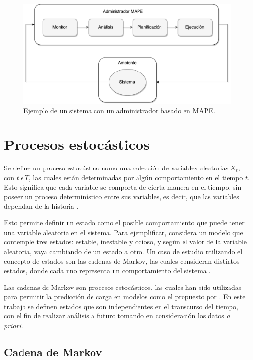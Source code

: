\begin{figure}[!ht]
	\centering
	\includegraphics[scale=0.55]{images/MAPE.pdf}
	\caption{Ejemplo de un sistema con un administrador basado en MAPE.}
	\label{fig:mape}
\end{figure}

\section{Procesos estoc\'asticos}
\label{sec:procesosEstocasticos}

Se define un proceso estoc\'astico como una colecci\'on de variables aleatorias {$X_t$, con $t ~ \epsilon ~ T$}, las cuales est\'an determinadas por alg\'un comportamiento en el tiempo $t$. Esto significa que cada variable se comporta de cierta manera en el tiempo, sin poseer un proceso determin\'istico entre sus variables, es decir, que las variables dependan de la historia \citep{taylor2014introduction}.

Esto permite definir un estado como el posible comportamiento que puede tener una variable aleatoria en el sistema. Para ejemplificar, considera un modelo que contemple tres estados: estable, inestable y ocioso, y seg\'un el valor de la variable aleatoria, vaya cambiando de un estado a otro. Un caso de estudio utilizando el concepto de estados son las cadenas de Markov, las cuales consideran distintos estados, donde cada uno representa un comportamiento del sistema \citep{de1978calculus}.

Las cadenas de Markov son procesos estoc\'asticos, las cuales han sido utilizadas para permitir la predicci\'on de carga en modelos como el propuesto por \citep{GongGW10}. En este trabajo se definen estados que son independientes en el transcurso del tiempo, con el fin de realizar an\'alisis a futuro tomando en consideraci\'on los datos \textit{a priori}.

\subsection{Cadena de Markov}
\label{subsec:cadenaMarkov}

